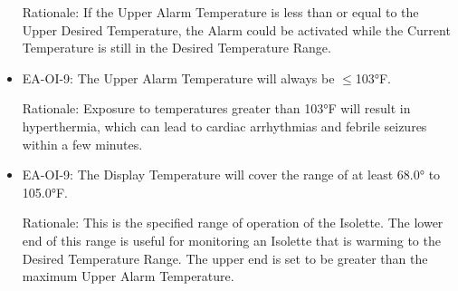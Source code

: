 \begin{itemize}
      Rationale: If the Upper Alarm Temperature is less than or equal to the Upper Desired
      Temperature, the Alarm could be activated while the Current Temperature is still in the
      Desired Temperature Range.
\item EA-OI-9: The Upper Alarm Temperature will always be $\leq$103°F.

      Rationale: Exposure to temperatures greater than 103°F will result in hyperthermia,
      which can lead to cardiac arrhythmias and febrile seizures within a few minutes.
\item EA-OI-9: The Display Temperature will cover the range of at least 68.0° to 105.0°F.

      Rationale: This is the specified range of operation of the Isolette. The lower end of this
      range is useful for monitoring an Isolette that is warming to the Desired Temperature
      Range. The upper end is set to be greater than the maximum Upper Alarm Temperature.
\end{itemize}